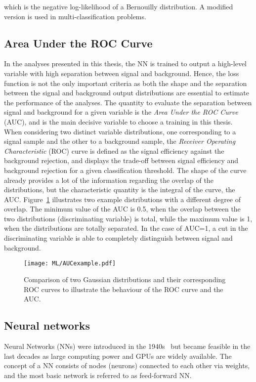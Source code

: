 which is the negative log-likelihood of a Bernouilly distribution. A modified version is used in multi-classification problems. 

\subsection{Area Under the ROC Curve}

In the analyses presented in this thesis, the NN is trained to output a high-level variable with high separation between signal and background. Hence, the loss function is not the only important criteria as both the shape and the separation between the signal and background output distributions are essential to estimate the performance of the analyses. The quantity to evaluate the separation between signal and background for a given variable is the \textit{Area Under the ROC Curve} (AUC), and is the main decisive variable to choose a training in this thesis.\\

When considering two distinct variable distributions, one corresponding to a signal sample and the other to a background sample, the \textit{Receiver Operating Characteristic} (ROC) curve is defined as the signal efficiency against the background rejection, and displays the trade-off between signal efficiency and background rejection for a given classification threshold. The shape of the curve already provides a lot of the information regarding the overlap of the distributions, but the characteristic quantity is the integral of the curve, the AUC. Figure~\ref{ML:AUC} illustrates two example distributions with a different degree of overlap. The minimum value of the AUC is 0.5, when the overlap between the two distributions (discriminating variable) is total, while the maximum value is 1, when the distributions are totally separated. In the case of AUC=1, a cut in the discriminating variable is able to completely distinguish between signal and background.

\begin{figure}[htbp]
    \RawFloats
    \begin{center}
    \texttt{[image: ML/AUCexample.pdf]}
    \caption{
        Comparison of two Gaussian distributions and their corresponding ROC curves to illustrate the behaviour of the ROC curve and the AUC.
    }
    \label{ML:AUC}
    \end{center}
\end{figure}

\subsection{Neural networks}
\label{ML:SectionNN}
Neural Networks (NNs) were introduced in the 1940s~\cite{McCulloch1943} but became feasible in the last decades as large computing power and GPUs are widely available. The concept of a NN consists of nodes (neurons) connected to each other via weights, and the most basic network is referred to as feed-forward NN.\\

